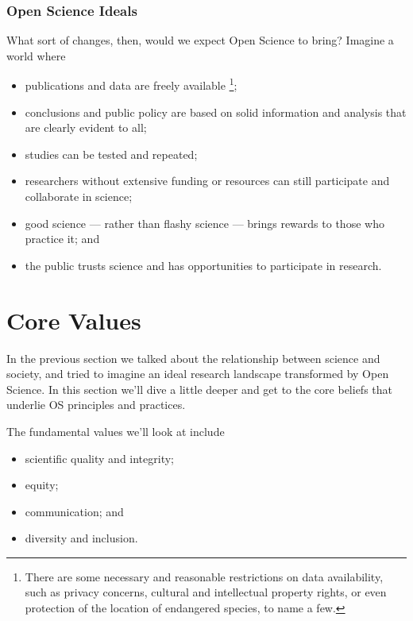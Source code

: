 \documentclass[
]{book}
\providecommand{\tightlist}{%
  \setlength{\itemsep}{0pt}\setlength{\parskip}{0pt}}
\begin{document}
\hypertarget{open-science-ideals}{%
\subsubsection*{Open Science Ideals}\label{open-science-ideals}}

What sort of changes, then, would we expect Open Science to bring? Imagine a world where

\begin{itemize}
\tightlist
\item
  publications and data are freely available \footnote{There are some necessary and reasonable restrictions on data availability, such as privacy concerns, cultural and intellectual property rights, or even protection of the location of endangered species, to name a few.};
\item
  conclusions and public policy are based on solid information and analysis that are clearly evident to all;
\item
  studies can be tested and repeated;
\item
  researchers without extensive funding or resources can still participate and collaborate in science;
\item
  good science --- rather than flashy science --- brings rewards to those who practice it; and
\item
  the public trusts science and has opportunities to participate in research.
\end{itemize}

\hypertarget{core-values}{%
\section{Core Values}\label{core-values}}

In the previous section we talked about the relationship between science and society, and tried to imagine an ideal research landscape transformed by Open Science. In this section we'll dive a little deeper and get to the core beliefs that underlie OS principles and practices.

The fundamental values we'll look at include

\begin{itemize}
\tightlist
\item
  scientific quality and integrity;
\item
  equity;
\item
  communication; and
\item
  diversity and inclusion.
\end{itemize}
\end{document}
